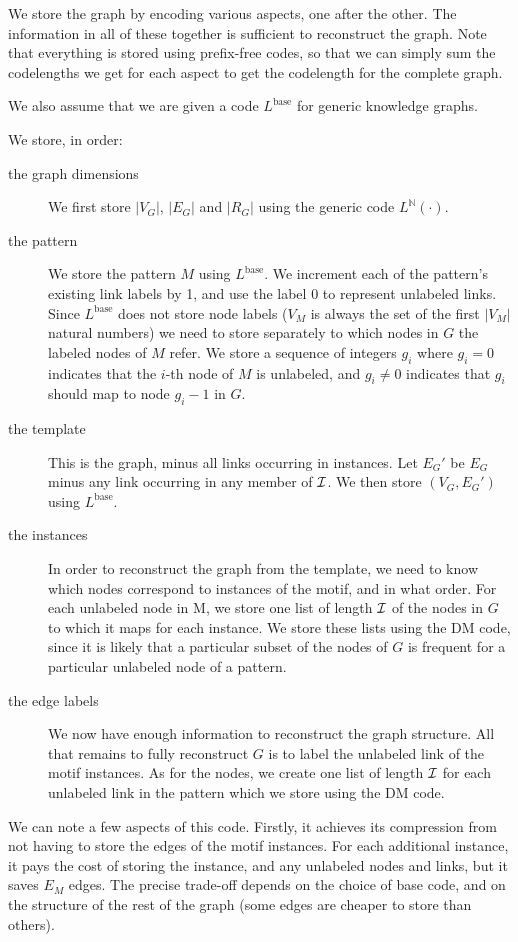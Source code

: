 \documentclass[11pt]{article}
\newcommand{\N}{{\mathbb N}}
\begin{document}
We store the graph by encoding various aspects, one after the other. The information in all of these together is sufficient to reconstruct the graph. Note that everything is stored using prefix-free codes, so that we can simply sum the codelengths we get for each aspect to get the codelength for the complete graph.

We also assume that we are given a code $L^\text{base}$ for generic knowledge graphs.

We store, in order:

\begin{description}
 \item[the graph dimensions] We first store $|V_G|$, $|E_G|$ and $|R_G|$ using the generic code $L^{\N}(\cdot)$.
 \item[the pattern] We store the pattern $M$ using $L^\text{base}$. We increment each of the pattern's existing link labels by 1, and use the label 0 to represent unlabeled links. Since $L^\text{base}$ does not store node labels ($V_M$ is always the set of the first $|V_M|$ natural numbers) we need to store separately to which nodes in $G$ the labeled nodes of $M$ refer. We store a sequence of integers ${g_i}$ where $g_i = 0$ indicates that the $i$-th node of $M$ is unlabeled, and $g_i \neq 0$ indicates that $g_i$ should map to node $g_i - 1$ in $G$.
 \item[the template] This is the graph, minus all links occurring in  instances. Let $E_G'$ be $E_G$ minus any link occurring in any member of $\cal I$. We then store $(V_G, E_G')$ using $L^\text{base}$.
 \item[the instances] In order to reconstruct the graph from the template, we need to know which nodes correspond to instances of the motif, and in what order. For each unlabeled node in M, we store one list of length $\cal I$ of the nodes in $G$ to which it maps for each instance. We store these lists using the DM code, since it is likely that a particular subset of the nodes of $G$ is frequent for a particular unlabeled node of a pattern.
 \item[the edge labels] We now have enough information to reconstruct the graph structure. All that remains to fully reconstruct $G$ is to label the unlabeled link of the motif instances. As for the nodes, we create one list of length $\cal I$ for each unlabeled  link in the pattern which we store using the DM code.
\end{description}
 
We can note a few aspects of this code. Firstly, it achieves its compression from not having to store the edges of the motif instances. For each additional instance, it pays the cost of storing the instance, and any unlabeled nodes and links, but it saves $E_M$ edges. The precise trade-off depends on the choice of base code, and on the structure of the rest of the graph (some edges are cheaper to store than others).
\end{document}
